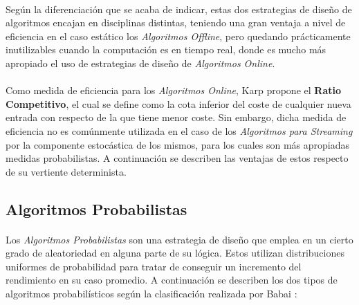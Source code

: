 \documentclass{subfiles}
\begin{document}
        \paragraph{}
        Según la diferenciación que se acaba de indicar, estas dos estrategias de diseño de algoritmos encajan en disciplinas distintas, teniendo una gran ventaja a nivel de eficiencia en el caso estático los \emph{Algoritmos Offline}, pero quedando prácticamente inutilizables cuando la computación es en tiempo real, donde es mucho más apropiado el uso de estrategias de diseño de \emph{Algoritmos Online}.

        \paragraph{}
        Como medida de eficiencia para los \emph{Algoritmos Online}, Karp \cite{Karp:1992:OAV:645569.659725} propone el \textbf{Ratio Competitivo}, el cual se define como la cota inferior del coste de cualquier nueva entrada con respecto de la que tiene menor coste. Sin embargo, dicha medida de eficiencia no es comúnmente utilizada en el caso de los \emph{Algoritmos para Streaming} por la componente estocástica de los mismos, para los cuales son más apropiadas medidas probabilistas. A continuación se describen las ventajas de estos respecto de su vertiente determinista.


      \subsection{Algoritmos Probabilistas}

        \paragraph{}
        Los \emph{Algoritmos Probabilistas} son una estrategia de diseño que emplea en un cierto grado de aleatoriedad en alguna parte de su lógica. Estos utilizan distribuciones uniformes de probabilidad para tratar de conseguir un incremento del rendimiento en su caso promedio. A continuación se describen los dos tipos de algoritmos probabilísticos según la clasificación realizada por Babai \cite{Babai79monte-carloalgorithms}:
\end{document}
